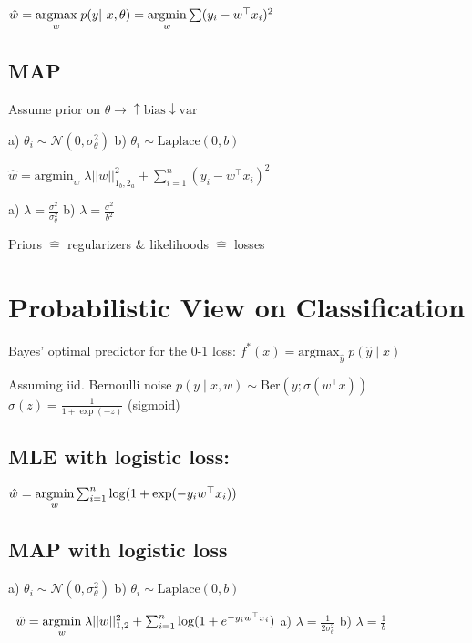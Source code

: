 $\hat w = \argmax{w} \; p(y | x, \theta) =\argmin{w} \sum (y_i - w^\top x_i)^2$ \\[-10pt]

\subsection*{MAP}

Assume prior on $\theta \rightarrow \uparrow \text{bias} \downarrow \text{var}$ 

a) $\theta_i \sim \mathcal{N}(0, \sigma^2_\theta)$ b) $\theta_i \sim \text{Laplace}(0, b)$

$\hat w = \text{argmin}_w \; \lambda ||w||_{1_b, 2_a}^2 + \sum_{i=1}^n(y_i - w^\top x_i)^2$

a) $\lambda = \frac{\sigma^2}{\sigma^2_\theta}$ b) $\lambda = \frac{\sigma^2}{b^2}$

Priors $\hat{=} $ regularizers \& likelihoods $\hat{=} $ losses

\section*{Probabilistic View on Classification}

Bayes' optimal predictor for the 0-1 loss: $f^*(x) = \text{argmax}_{\hat y} \; p(\hat y \; | \; x)$

Assuming iid. Bernoulli noise \quad $p(y \; | \; x,w) \sim \text{Ber}(y; \sigma(w^\top x))$
$\sigma(z) = \frac{1}{1 + \exp(-z)}$ (sigmoid)

\subsection*{MLE with logistic loss:}

\;$\hat w = \underset{w}{\text{argmin}} \sum_{i = 1}^n \log (1 + \exp(-y_i w^\top x_i))$

\subsection*{MAP with logistic loss}

a) $\theta_i \sim \mathcal{N}(0, \sigma^2_\theta)$ b) $\theta_i \sim \text{Laplace}(0, b)$


$\; \;\hat w = \underset{w}{\text{argmin}} \; \lambda ||w||_{1, 2}^2 + \sum_{i = 1}^n \log (1 + e^{-y_i w^\top x_i})$
a) $\lambda = \frac{1}{2 \sigma^2_\theta}$ b) $\lambda = \frac{1}{b}$






